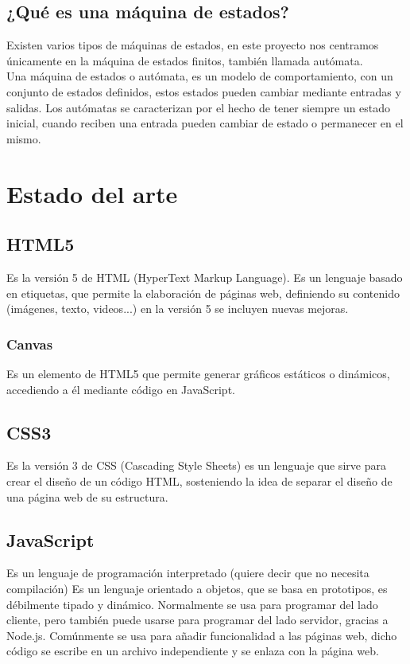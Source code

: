 \documentclass[a4paper,10pt]{article}
\begin{document}
\subsection{¿Qué es una máquina de estados?}

Existen varios tipos de máquinas de estados, en este proyecto nos centramos únicamente 
en la máquina de estados finitos, también llamada autómata.\\

Una máquina de estados o autómata, es un modelo de comportamiento, con un conjunto de estados definidos, 
estos estados pueden cambiar mediante entradas y salidas.
Los autómatas se caracterizan por el hecho de tener siempre un estado inicial, cuando reciben una entrada 
pueden cambiar de estado o permanecer en el mismo.
\cleardoublepage

\section{Estado del arte}
\subsection{HTML5}

Es la versión 5 de HTML (HyperText Markup Language). Es un lenguaje basado en etiquetas,
que permite la elaboración de páginas web, definiendo su contenido (imágenes, texto,
videos...) en la versión 5 se incluyen nuevas mejoras.

\subsubsection{Canvas}

Es un elemento de HTML5 que permite generar gráficos estáticos o dinámicos, accediendo a él
mediante código en JavaScript.

\subsection{CSS3}

Es la versión 3 de CSS (Cascading Style Sheets) es un lenguaje que sirve para crear el diseño de
un código HTML, sosteniendo la idea de separar el diseño de una página web de su estructura. 

\subsection{JavaScript}

Es un lenguaje de programación interpretado (quiere decir que no necesita compilación) Es un
lenguaje orientado a objetos, que se basa en prototipos, es débilmente tipado y dinámico.
Normalmente se usa para programar del lado cliente, pero también puede usarse para
programar del lado servidor, gracias a Node.js. Comúnmente se usa para añadir funcionalidad
a las páginas web, dicho código se escribe en un archivo independiente y se enlaza con la
página web.
\end{document}
